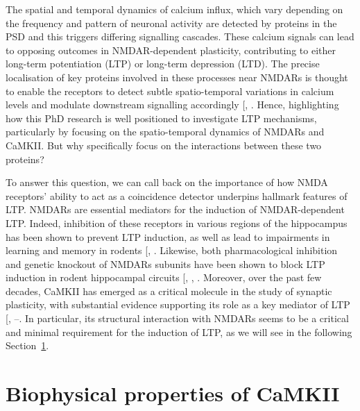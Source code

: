 \documentclass[
  11pt,
  letterpaper,
]{scrreprt}
\begin{document}
The spatial and temporal dynamics of calcium influx, which vary
depending on the frequency and pattern of neuronal activity are detected
by proteins in the PSD and this triggers differing signalling cascades.
These calcium signals can lead to opposing outcomes in NMDAR-dependent
plasticity, contributing to either long-term potentiation (LTP) or
long-term depression (LTD). The precise localisation of key proteins
involved in these processes near NMDARs is thought to enable the
receptors to detect subtle spatio-temporal variations in calcium levels
and modulate downstream signalling accordingly
{[},
\citeproc{ref-brini2013Intracellular}{150}{]}. Hence, highlighting how
this PhD research is well positioned to investigate LTP mechanisms,
particularly by focusing on the spatio-temporal dynamics of NMDARs and
CaMKII. But why specifically focus on the interactions between these two
proteins?

To answer this question, we can call back on the importance of how NMDA
receptors' ability to act as a coincidence detector underpins hallmark
features of LTP. NMDARs are essential mediators for the induction of
NMDAR-dependent LTP. Indeed, inhibition of these receptors in various
regions of the hippocampus has been shown to prevent LTP induction, as
well as lead to impairments in learning and memory in rodents
{[},
\citeproc{ref-collingridge1983Excitatory}{59}{]}. Likewise, both
pharmacological inhibition and genetic knockout of NMDARs subunits have
been shown to block LTP induction in rodent hippocampal circuits
{[},
,
\citeproc{ref-alkadhi2021NMDA}{151}{]}. Moreover, over the past few
decades, CaMKII has emerged as a critical molecule in the study of
synaptic plasticity, with substantial evidence supporting its role as a
key mediator of LTP {[},
--\citeproc{ref-chen2024CaMKII}{155}{]}.
In particular, its structural interaction with NMDARs seems to be a
critical and minimal requirement for the induction of LTP, as we will
see in the following Section~\ref{sec-camkii-properties}.

\section{Biophysical properties of CaMKII}\label{sec-camkii-properties}
\end{document}
